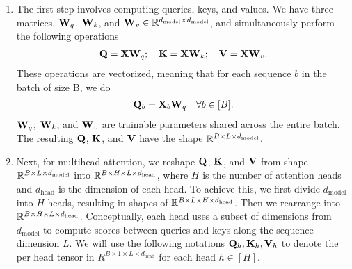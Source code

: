\documentclass[11pt]{article}  %
\begin{document}
\begin{enumerate}
  \item The first step involves computing queries, keys, and values. 
  We have three matrices, $\mathbf{W}_q$, $\mathbf{W}_k$, and $\mathbf{W}_v \in \mathbb{R}^{d_{\text{model}} \times d_{\text{model}}}$, and simultaneously perform the following operations
  \begin{align}
    \mathbf{Q} = \mathbf{X} \mathbf{W}_{q};\quad \mathbf{K} = \mathbf{X} \mathbf{W}_{k};\quad \mathbf{V} = \mathbf{X}\mathbf{W}_{v}.
  \end{align}
  These operations are vectorized, meaning that for each sequence $b$ in the batch of size B, we do 
  \begin{align*}
    \mathbf{Q}_b = \mathbf{X}_b\mathbf{W}_{q} \quad \forall b \in [B].
  \end{align*} 
  $\mathbf{W}_q$, $\mathbf{W}_k$, and $\mathbf{W}_v$ are trainable parameters shared across the entire batch. 
  The resulting $\mathbf{Q}$, $\mathbf{K}$, and $\mathbf{V}$ have the shape $\mathbb{R}^{B \times L \times d_{\text{model}}}$.

  \item Next, for multihead attention, we reshape $\mathbf{Q}$, $\mathbf{K}$, and $\mathbf{V}$ from shape $\mathbb{R}^{B \times L \times d_{\text{model}}}$ into $\mathbb{R}^{B \times H \times L \times d_{\text{head}}}$, where $H$ is the number of attention heads and $d_{\text{head}}$ is the dimension of each head.
  To achieve this, we first divide $d_{\text{model}}$ into $H$ heads, resulting in shapes of $\mathbb{R}^{B \times L \times H \times d_{\text{head}}}$. 
  Then we rearrange into $\mathbb{R}^{B \times H \times L \times d_{\text{head}}}$.
  Conceptually, each head uses a subset of dimensions from $d_{\text{model}}$ to compute scores between queries and keys along the sequence dimension $L$.
  We will use the following notations $\mathbf{Q}_h, \mathbf{K}_h, \mathbf{V}_h$ to denote the per head tensor in $R^{B \times 1 \times L \times d_{\text{head}}}$ for each head $h \in [H]$.


\end{enumerate}
\end{document}
